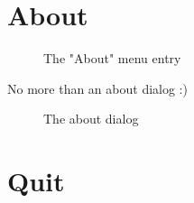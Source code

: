 \documentclass[10pt]{report}
\begin{document}
\section{About}

\begin{figure}[H]
\centering
{}
\caption{The "About" menu entry}
\end{figure}
No more than an about dialog :)\newline

\begin{figure}[H]
\centering
{}
\caption{The about dialog}
\end{figure}

\section{Quit}
\end{document}
